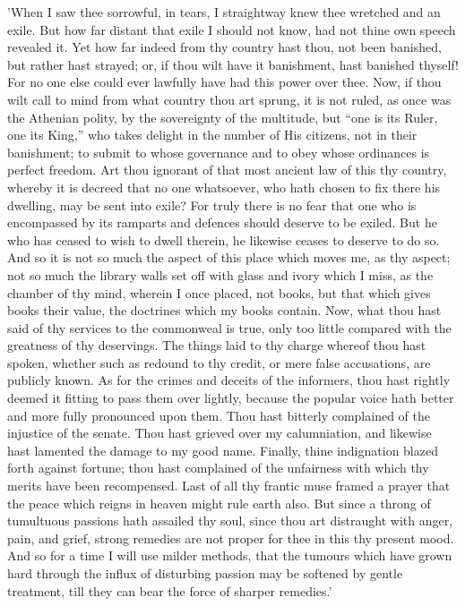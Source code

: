 'When I saw thee sorrowful, in tears, I straightway knew thee wretched
and an exile. But how far distant that exile I should not know, had not
thine own speech revealed it. Yet how far indeed from thy country hast
thou, not been banished, but rather hast strayed; or, if thou wilt have
it banishment, hast banished thyself! For no one else could ever
lawfully have had this power over thee. Now, if thou wilt call to mind
from what country thou art sprung, it is not ruled, as once was the
Athenian polity, by the sovereignty of the multitude, but ``one is its
Ruler, one its King,'' who takes delight in the number of His citizens,
not in their banishment; to submit to whose governance and to obey
whose ordinances is perfect freedom. Art thou ignorant of that most
ancient law of this thy country, whereby it is decreed that no one
whatsoever, who hath chosen to fix there his dwelling, may be sent into
exile? For truly there is no fear that one who is encompassed by its
ramparts and defences should deserve to be exiled. But he who has ceased
to wish to dwell therein, he likewise ceases to deserve to do so. And so
it is not so much the aspect of this place which moves me, as thy
aspect; not so much the library walls set off with glass and ivory which
I miss, as the chamber of thy mind, wherein I once placed, not books,
but that which gives books their value, the doctrines which my books
contain. Now, what thou hast said of thy services to the commonweal is
true, only too little compared with the greatness of thy deservings. The
things laid to thy charge whereof thou hast spoken, whether such as
redound to thy credit, or mere false accusations, are publicly known. As
for the crimes and deceits of the informers, thou hast rightly deemed
it fitting to pass them over lightly, because the popular voice hath
better and more fully pronounced upon them. Thou hast bitterly
complained of the injustice of the senate. Thou hast grieved over my
calumniation, and likewise hast lamented the damage to my good name.
Finally, thine indignation blazed forth against fortune; thou hast
complained of the unfairness with which thy merits have been
recompensed. Last of all thy frantic muse framed a prayer that the peace
which reigns in heaven might rule earth also. But since a throng of
tumultuous passions hath assailed thy soul, since thou art distraught
with anger, pain, and grief, strong remedies are not proper for thee in
this thy present mood. And so for a time I will use milder methods, that
the tumours which have grown hard through the influx of disturbing
passion may be softened by gentle treatment, till they can bear the
force of sharper remedies.'

